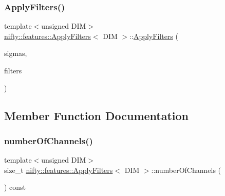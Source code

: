\subsubsection{\texorpdfstring{Apply\+Filters()}{ApplyFilters()}}
{\footnotesize\ttfamily template$<$unsigned D\+IM$>$ \\
\hyperlink{structnifty_1_1features_1_1ApplyFilters}{nifty\+::features\+::\+Apply\+Filters}$<$ D\+IM $>$\+::\hyperlink{structnifty_1_1features_1_1ApplyFilters}{Apply\+Filters} (\begin{DoxyParamCaption}\item[{const std\+::vector$<$ double $>$ \&}]{sigmas,  }\item[{const std\+::vector$<$ \hyperlink{structnifty_1_1features_1_1FilterBase}{Filter\+Base} $\ast$$>$}]{filters }\end{DoxyParamCaption})\hspace{0.3cm}{\ttfamily [inline]}}



\subsection{Member Function Documentation}
\mbox{\label{structnifty_1_1features_1_1ApplyFilters_a7f28df00a4ecfcbeff8cafcae8d7a2b5}} 
\subsubsection{\texorpdfstring{number\+Of\+Channels()}{numberOfChannels()}}
{\footnotesize\ttfamily template$<$unsigned D\+IM$>$ \\
size\+\_\+t \hyperlink{structnifty_1_1features_1_1ApplyFilters}{nifty\+::features\+::\+Apply\+Filters}$<$ D\+IM $>$\+::number\+Of\+Channels (\begin{DoxyParamCaption}{ }\end{DoxyParamCaption}) const\hspace{0.3cm}{\ttfamily [inline]}}

\mbox{\label{structnifty_1_1features_1_1ApplyFilters_a63d2a6c7fca07fed1921c6c8bf8ecc19}} 
